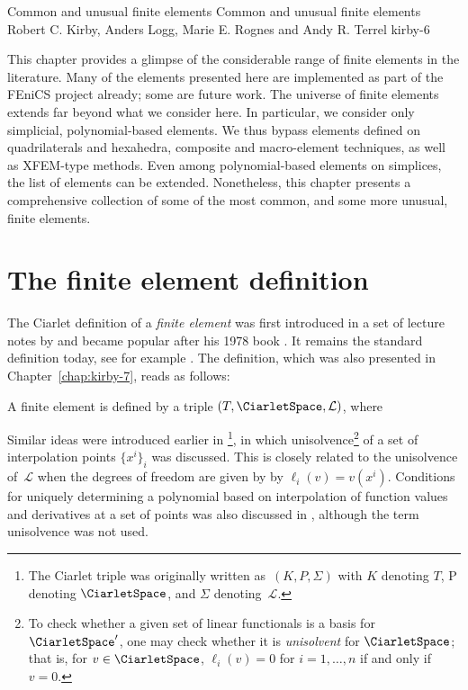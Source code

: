               {Common and unusual finite elements}
              {Common and unusual finite elements}
              {Robert C. Kirby, Anders Logg, Marie E. Rognes and Andy R. Terrel}
              {kirby-6}

\newcommand{\elmfig}[1]{\texttt{[image: chapters/kirby-6/png/\#1.png]}}
\newcommand{\elmdesc}[1]{\begin{minipage}{4cm} #1 \end{minipage} \\}

This chapter provides a glimpse of the considerable range of finite
elements in the literature. Many of the elements presented here are
implemented as part of the FEniCS project already; some are future work.
The universe of finite elements extends far beyond what we consider
here. In particular, we consider only simplicial, polynomial-based
elements. We thus bypass elements defined on quadrilaterals and hexahedra,
composite and macro-element techniques, as well as XFEM-type methods. Even
among polynomial-based elements on simplices, the list of elements can be
extended. Nonetheless, this chapter presents a comprehensive collection
of some of the most common, and some more unusual, finite elements.

\section{The finite element definition}

The Ciarlet definition of a \emph{finite element} was first introduced
in a set of lecture notes by \citet{Ciarlet1975} and became popular
after his 1978 book \citep{Ciarlet2002}. It remains the standard
definition today, see for example \citet{BrennerScott2008}. The
definition, which was also presented in Chapter~\ref{chap:kirby-7},
reads as follows:
\begin{definition}
  A finite element is defined by a triple
  $(T, \CiarletSpace,\mathcal{L})$, where
  \femdefinition{}
\end{definition}
Similar ideas were introduced earlier in
\citet{CiarletRaviart1972}\footnote{The Ciarlet triple was originally
  written as~$(K, P, \Sigma)$ with $K$ denoting $T$, P denoting $\CiarletSpace$, and $\Sigma$
  denoting~$\mathcal{L}$.}, in which unisolvence\footnote{To check
  whether a given set of linear functionals is a basis for
  $\CiarletSpace'$, one may check whether it is \emph{unisolvent} for
  $\CiarletSpace$; that is, for $v \in \CiarletSpace$, $\ell_i(v) = 0$
  for $i = 1, \dots, n$ if and only if $v = 0$.} of a set of
interpolation points $\{x^i\}_i$ was discussed. This is closely
related to the unisolvence of~$\mathcal{L}$ when the degrees of
freedom are given by by $\ell_i(v) = v(x^i)$.  Conditions for uniquely
determining a polynomial based on interpolation of function values and
derivatives at a set of points was also discussed in
\citet{BrambleZlamal1970}, although the term unisolvence was not used.

